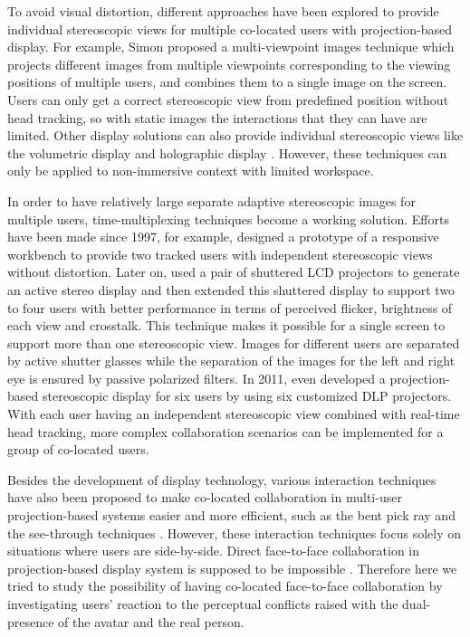 To avoid visual distortion, different approaches have been explored to provide individual stereoscopic views for multiple co-located users with projection-based display. For example, Simon proposed a multi-viewpoint images technique \citep{Simon2007MVI} which projects different images from multiple viewpoints corresponding to the viewing positions of multiple users, and combines them to a single image on the screen. Users can only get a correct stereoscopic view from predefined position without head tracking, so with static images the interactions that they can have are limited. Other display solutions can also provide individual stereoscopic views like the volumetric display \citep{Grossman2008Volum} and holographic display \citep{Lucente1997Holo}. However, these techniques can only be applied to non-immersive context with limited workspace.

In order to have relatively large separate adaptive stereoscopic images for multiple users, time-multiplexing techniques become a working solution. Efforts have been made since 1997, for example, \citet{Agrawala1997TRW} designed a prototype of a responsive workbench to provide two tracked users with independent stereoscopic views without distortion. Later on, \citet{Kunz2002TSC} used a pair of shuttered LCD projectors to generate an active stereo display and then \citet{Frohlich2005MultiViewer} extended this shuttered display to support two to four users with better performance in terms of perceived flicker, brightness of each view and crosstalk. This technique makes it possible for a single screen to support more than one stereoscopic view. Images for different users are separated by active shutter glasses while the separation of the images for the left and right eye is ensured by passive polarized filters. In 2011, \citet{Kulik2011CSS} even developed a projection-based stereoscopic display for six users by using six customized DLP projectors. With each user having an independent stereoscopic view combined with real-time head tracking, more complex collaboration scenarios can be implemented for a group of co-located users.

Besides the development of display technology, various interaction techniques have also been proposed to make co-located collaboration in multi-user projection-based systems easier and more efficient, such as the bent pick ray \citep{Riege2006Bent} and the see-through techniques \citep{Argelaguet2010STT}. However, these interaction techniques focus solely on situations where users are side-by-side. Direct face-to-face collaboration in projection-based display system is supposed to be impossible \citep{Salzmann2009CIC}. Therefore here we tried to study the possibility of having co-located face-to-face collaboration by investigating users' reaction to the perceptual conflicts raised with the dual-presence of the avatar and the real person.

